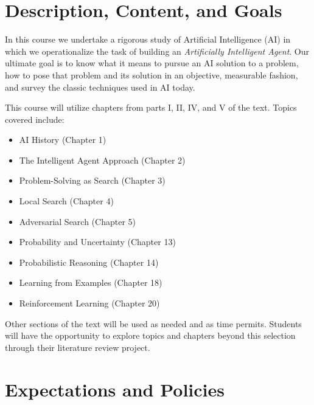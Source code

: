 \documentclass[10pt]{article}
\begin{document}
\section{Description, Content, and Goals}

In this course we undertake a rigorous study of Artificial Intelligence (AI) in which we
operationalize the task of building an \textit{Artificially Intelligent Agent}. Our
ultimate goal is to know what it means to pursue an AI solution to a problem, how
to pose that problem and its solution in an objective, measurable fashion, and
survey the classic techniques used in AI today.

This course will utilize chapters from parts I, II, IV, and V of the text. Topics covered include:
\begin{itemize}
\item AI History (Chapter 1)
\item The Intelligent Agent Approach (Chapter 2)
\item Problem-Solving as Search (Chapter 3)
\item Local Search (Chapter 4)
\item Adversarial Search (Chapter 5)
\item Probability and Uncertainty (Chapter 13)
\item Probabilistic Reasoning (Chapter 14)
\item Learning from Examples (Chapter 18)
\item Reinforcement Learning (Chapter 20)
\end{itemize}
Other sections of the text will be used as needed and as time permits.  Students will have the opportunity to explore topics and chapters beyond this selection through their literature review project.

\section{Expectations and Policies}
\end{document}
